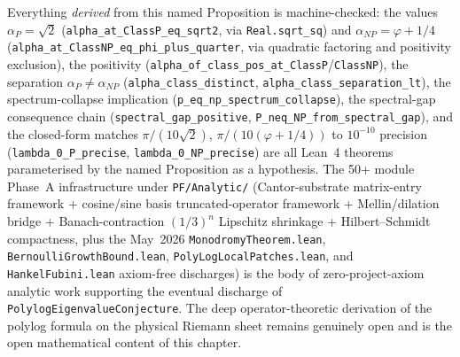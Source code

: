 \begin{remark}
Everything \emph{derived} from this named Proposition is machine-checked: the values $\alpha_P = \sqrt{2}$ (\texttt{alpha\_at\_ClassP\_eq\_sqrt2}, via \texttt{Real.sqrt\_sq}) and $\alpha_{NP} = \varphi + 1/4$ (\texttt{alpha\_at\_ClassNP\_eq\_phi\_plus\_quarter}, via quadratic factoring and positivity exclusion), the positivity (\texttt{alpha\_of\_class\_pos\_at\_ClassP}/\texttt{ClassNP}), the separation $\alpha_P \neq \alpha_{NP}$ (\texttt{alpha\_class\_distinct}, \texttt{alpha\_class\_separation\_lt}), the spectrum-collapse implication (\texttt{p\_eq\_np\_spectrum\_collapse}), the spectral-gap consequence chain (\texttt{spectral\_gap\_positive}, \texttt{P\_neq\_NP\_from\_spectral\_gap}), and the closed-form matches $\pi/(10\sqrt{2})$, $\pi/(10(\varphi + 1/4))$ to $10^{-10}$ precision (\texttt{lambda\_0\_P\_precise}, \texttt{lambda\_0\_NP\_precise}) are all Lean~4 theorems parameterised by the named Proposition as a hypothesis. The 50+ module Phase~A infrastructure under \texttt{PF/Analytic/} (Cantor-substrate matrix-entry framework + cosine/sine basis truncated-operator framework + Mellin/dilation bridge + Banach-contraction $(1/3)^n$ Lipschitz shrinkage + Hilbert--Schmidt compactness, plus the May~2026 \texttt{MonodromyTheorem.lean}, \texttt{BernoulliGrowthBound.lean}, \texttt{PolyLogLocalPatches.lean}, and \texttt{HankelFubini.lean} axiom-free discharges) is the body of zero-project-axiom analytic work supporting the eventual discharge of \texttt{PolylogEigenvalueConjecture}. The deep operator-theoretic derivation of the polylog formula on the physical Riemann sheet remains genuinely open and is the open mathematical content of this chapter.
\end{remark}


